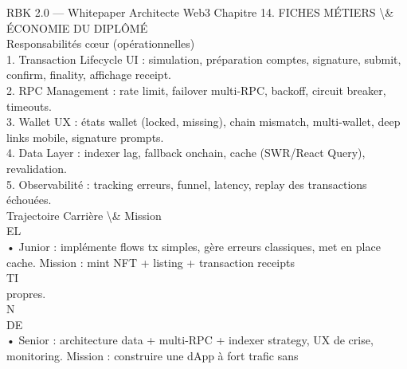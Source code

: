\documentclass[12pt,landscape,a4paper]{article}
\begin{document}
RBK 2.0 — Whitepaper Architecte Web3                                              Chapitre 14. FICHES MÉTIERS \textbackslash{}& ÉCONOMIE DU DIPLÔMÉ\\
\vspace{0.5em}
\vspace{0.5em}
Responsabilités cœur (opérationnelles)\\
\vspace{0.5em}
1. Transaction Lifecycle UI : simulation, préparation comptes, signature, submit, confirm, finality, affichage receipt.\\
\vspace{0.5em}
2. RPC Management : rate limit, failover multi-RPC, backoff, circuit breaker, timeouts.\\
\vspace{0.5em}
3. Wallet UX : états wallet (locked, missing), chain mismatch, multi-wallet, deep links mobile, signature prompts.\\
\vspace{0.5em}
4. Data Layer : indexer lag, fallback onchain, cache (SWR/React Query), revalidation.\\
\vspace{0.5em}
5. Observabilité : tracking erreurs, funnel, latency, replay des transactions échouées.\\
\vspace{0.5em}
Trajectoire Carrière \textbackslash{}& Mission\\
\vspace{0.5em}
\vspace{0.5em}
\vspace{0.5em}
\vspace{0.5em}
EL\\
• Junior : implémente flows tx simples, gère erreurs classiques, met en place cache. Mission : mint NFT + listing + transaction receipts\\
\vspace{0.5em}
\vspace{0.5em}
\vspace{0.5em}
\vspace{0.5em}
TI\\
propres.\\
\vspace{0.5em}
\vspace{0.5em}
\vspace{0.5em}
\vspace{0.5em}
N\\
DE\\
• Senior : architecture data + multi-RPC + indexer strategy, UX de crise, monitoring. Mission : construire une dApp à fort trafic sans\\
\end{document}
